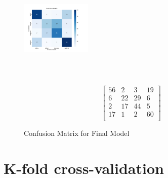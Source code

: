 \begin{figure}[h!]
  \centering

  \includegraphics[width=0.3\textwidth, height=5cm]{resources/cfmt-final.jpeg}

  \begin{subfigure}{\textwidth} %
    \centering
    \[
    \begin{bmatrix}
      56 & 2 & 3 & 19 \\
      6 & 22 & 29 & 6 \\
      2 & 17 & 44 & 5 \\
      17 & 1 & 2 & 60 \\
    \end{bmatrix}
    \]
  \end{subfigure}
  \caption{Confusion Matrix for Final Model}
\end{figure}

\section {K-fold cross-validation}

